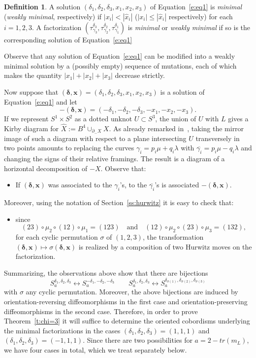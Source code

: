 \documentclass[11pt,a4paper]{amsart}
\newcommand{\de}{\delta}
\newcommand{\si}{\sigma}
\newcommand{\ga}{\gamma}
\newcommand{\la}{\lambda}
\newcommand{\x}{\times}
\newcommand{\del}{\partial}
\newcommand{\tr}{tr}
\newcommand{\bde}{\bm{\de}}
\newcommand{\bx}{\bm{x}}
\theoremstyle{definition}
\newtheorem{defn}[thm]{Definition}
\numberwithin{equation}{section}
\begin{document}
\begin{defn}
	A solution $(\de_1,\de_2,\de_3,x_1,x_2,x_3)$ of Equation~\eqref{e:eq1} is {\em minimal} ({\em weakly minimal}, respectively) 
	if $|x_i|< |\hat x_i|$ ($|x_i|\leq |\hat x_i|$ respectively) for each $i=1,2,3$. A factorization $(\tau_{\ga_3}^{\de_3},\tau_{\ga_2}^{\de_2},\tau_{\ga_1}^{\de_1})$ is {\em minimal} or {\em weakly minimal} if so is the corresponding solution of Equation~\eqref{e:eq1} 
\end{defn}

Observe that any solution of Equation~\eqref{e:eq1} can be modified into a weakly minimal solution by a (possibly empty) sequence of mutations, each of which makes the quantity $|x_1|+|x_2|+|x_3|$ decrease strictly. 



Now suppose that $(\bde,\bx) = (\de_1,\de_2,\de_3,x_1,x_2,x_3)$ is a solution of Equation~\eqref{e:eq1} and let 
\[
-(\bde,\bx)=(-\de_1,-\de_2,-\de_3,-x_1,-x_2,-x_3).
\]
If we represent $S^1\x S^2$ as a dotted unknot $U \subset S^3$, the union of $U$ with $L$ gives a Kirby 
diagram for $\hat X := B^4\cup_{\del_- X} X$. As already remarked in~\cite[Section~4.4]{LP22-2}, taking the mirror 
image of such a diagram with respect to a plane intersecting $U$ transversely in two points amounts to replacing the curves $\ga_i=p_i \mu + q_i \la$ with 
$\overline{\ga_i}=p_i \mu-q_i\la$ and changing the signs of their relative framings. 
The result is a diagram of a horizontal decomposition of $-X$. 
Observe that:
\begin{itemize}
\item 
If $(\bde,\bx)$ was associated to the $\ga_i$'s, to the $\overline{\ga_i}$'s is associated 
$-(\bde,\bx)$. 
\end{itemize}
Moreover, using the notation of Section~\ref{ss:hurwitz} it is easy to check 
that:
\begin{itemize} 
\item 
since 
\[
(23)\circ\mu_2\circ (12)\circ\mu_1= (123)\quad\text{and}\quad  
(12)\circ\mu_2\circ (23)\circ\mu_3 = (132), 
\]
for each cyclic permutation $\sigma$ of $(1,2,3)$, 
the transformation $(\bde,\bx)\mapsto\si(\bde,\bx)$ is realized by a composition of 
two Hurwitz moves on the factorization.
\end{itemize}
Summarizing, the observations above show that there are bijections 
\[
S_a^{\de_1,\de_2,\de_3} \longleftrightarrow S_a^{-\de_1,-\de_2,-\de_3}\qquad 
S_a^{\de_1,\de_2,\de_3} \longleftrightarrow S_a^{\de_{\sigma(1)},\de_{\sigma(2)},\de_{\sigma(3)}}
\]
with $\si$ any cyclic permutation. 
Moreover, the above bijections are induced by orientation-reversing diffeomorphisms 
in the first case and orientation-preserving diffeomorphisms in the second case. 
Therefore, in order to prove Theorem~\ref{t:chi=3} it will suffice to determine 
the oriented cobordisms underlying the minimal 
factorizations in the cases $(\de_1,\de_2,\de_3)=(1,1,1)$ and $(\de_1,\de_2,\de_3)=(-1,1,1)$. 
Since there are two possibilities for $a=2-\tr(m_L)$, we have four cases in total, 
which we treat separately below.
\end{document}
